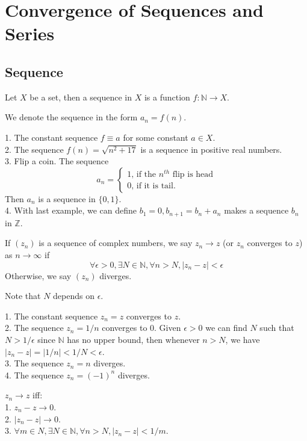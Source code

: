 \section{Convergence of Sequences and Series}
\subsection{Sequence}
\begin{definition}
    Let $X$ be a set, then a sequence in $X$ is a function $f:\mathbb N\to X$.
\end{definition}
We denote the sequence in the form $a_n=f(n)$.
\begin{example}
    1. The constant sequence $f\equiv a$ for some constant $a\in X$.\\
    2. The sequence $f(n)=\sqrt{n^2+17}$ is a sequence in positive real numbers.\\
    3. Flip a coin.
    The sequence
    $$a_n=\begin{cases}
        1\text{, if the $n^{th}$ flip is head}\\
        0\text{, if it is tail.}
    \end{cases}$$
    Then $a_n$ is a sequence in $\{0,1\}$.\\
    4. With last example, we can define $b_1=0,b_{n+1}=b_n+a_n$ makes a sequence $b_n$ in $\mathbb Z$.
\end{example}
\begin{definition}
    If $(z_n)$ is a sequence of complex numbers, we say $z_n\to z$ (or $z_n$ converges to $z$) as $n\to\infty$ if
    $$\forall\epsilon>0,\exists N\in\mathbb N,\forall n>N,|z_n-z|<\epsilon$$
    Otherwise, we say $(z_n)$ diverges.
\end{definition}
Note that $N$ depends on $\epsilon$.
\begin{example}
    1. The constant sequence $z_n=z$ converges to $z$.\\
    2. The sequence $z_n=1/n$ converges to $0$.
    Given $\epsilon>0$ we can find $N$ such that $N>1/\epsilon$ since $\mathbb N$ has no upper bound, then whenever $n>N$, we have $|z_n-z|=|1/n|<1/N<\epsilon$.\\
    3. The sequence $z_n=n$ diverges.\\
    4. The sequence $z_n=(-1)^n$ diverges.
\end{example}
\begin{proposition}
    $z_n\to z$ iff:\\
    1. $z_n-z\to 0$.\\
    2. $|z_n-z|\to 0$.\\
    3. $\forall m\in N,\exists N\in\mathbb N, \forall n>N,|z_n-z|<1/m$.
\end{proposition}
